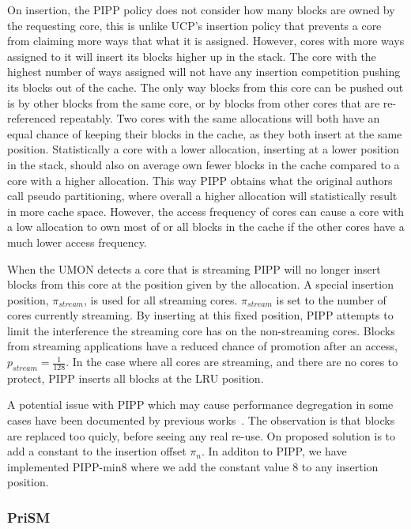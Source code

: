 On insertion, the PIPP policy does not consider how many blocks are owned by the requesting core, this is unlike UCP's insertion policy that prevents a core from claiming more ways that what it is assigned.
However, cores with more ways assigned to it will insert its blocks higher up in the stack. 
The core with the highest number of ways assigned will not have any insertion competition pushing its blocks out of the cache.
The only way blocks from this core can be pushed out is by other blocks from the same core, or by blocks from other cores that are re-referenced repeatably.
Two cores with the same allocations will both have an equal chance of keeping their blocks in the cache, as they both insert at the same position.
Statistically a core with a lower allocation, inserting at a lower position in the stack, should also on average own fewer blocks in the cache compared to a core with a higher allocation.
This way PIPP obtains what the original authors call pseudo partitioning, where overall a higher allocation will statistically result in more cache space.
However, the access frequency of cores can cause a core with a low allocation to own most of or all blocks in the cache if the other cores have a much lower access frequency.

When the UMON detects a core that is streaming PIPP will no longer insert blocks from this core at the position given by the allocation.
A special insertion position, $\pi_{stream}$, is used for all streaming cores.
$\pi_{stream}$ is set to the number of cores currently streaming. 
By inserting at this fixed position, PIPP attempts to limit the interference the streaming core has on the non-streaming cores.
Blocks from streaming applications have a reduced chance of promotion after an access, $p_{stream} = \frac{1}{128}$.
In the case where all cores are streaming, and there are no cores to protect, PIPP inserts all blocks at the LRU position.

A potential issue with PIPP which may cause performance degregation in some cases have been documented by previous works~\cite{manikantan12}.
The observation is that blocks are replaced too quicly, before seeing any real re-use.
On proposed solution is to add a constant to the insertion offset $\pi_n$.
In additon to PIPP, we have implemented PIPP-min8 where we add the constant value 8 to any insertion position.

\subsubsection{PriSM}

